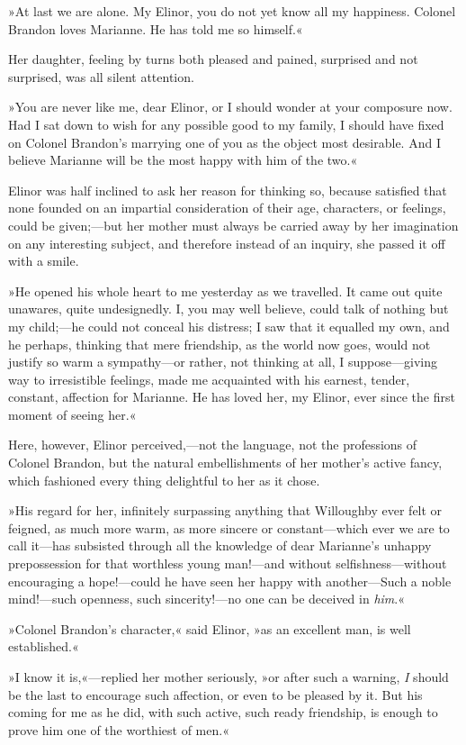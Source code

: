 »At last we are alone. My Elinor, you do not yet know all my happiness. Colonel Brandon loves Marianne. He has told me so himself.«

Her daughter, feeling by turns both pleased and pained, surprised and not surprised, was all silent attention.

»You are never like me, dear Elinor, or I should wonder at your composure now. Had I sat down to wish for any possible good to my family, I should have fixed on Colonel Brandon’s marrying one of you as the object most desirable. And I believe Marianne will be the most happy with him of the two.«

Elinor was half inclined to ask her reason for thinking so, because satisfied that none founded on an impartial consideration of their age, characters, or feelings, could be given;—but her mother must always be carried away by her imagination on any interesting subject, and therefore instead of an inquiry, she passed it off with a smile.

»He opened his whole heart to me yesterday as we travelled. It came out quite unawares, quite undesignedly. I, you may well believe, could talk of nothing but my child;—he could not conceal his distress; I saw that it equalled my own, and he perhaps, thinking that mere friendship, as the world now goes, would not justify so warm a sympathy—or rather, not thinking at all, I suppose—giving way to irresistible feelings, made me acquainted with his earnest, tender, constant, affection for Marianne. He has loved her, my Elinor, ever since the first moment of seeing her.«

Here, however, Elinor perceived,—not the language, not the professions of Colonel Brandon, but the natural embellishments of her mother’s active fancy, which fashioned every thing delightful to her as it chose.

»His regard for her, infinitely surpassing anything that Willoughby ever felt or feigned, as much more warm, as more sincere or constant—which ever we are to call it—has subsisted through all the knowledge of dear Marianne’s unhappy prepossession for that worthless young man!—and without selfishness—without encouraging a hope!—could he have seen her happy with another—Such a noble mind!—such openness, such sincerity!—no one can be deceived in \textit{him}.«

»Colonel Brandon’s character,« said Elinor, »as an excellent man, is well established.«

»I know it is,«—replied her mother seriously, »or after such a warning, \textit{I} should be the last to encourage such affection, or even to be pleased by it. But his coming for me as he did, with such active, such ready friendship, is enough to prove him one of the worthiest of men.«

